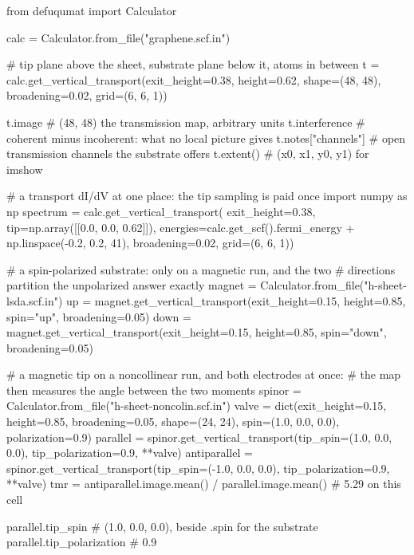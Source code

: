 \documentclass[11pt,a4paper]{article}
\begin{document}
\begin{pycode}
from defuqumat import Calculator

calc = Calculator.from_file("graphene.scf.in")

# tip plane above the sheet, substrate plane below it, atoms in between
t = calc.get_vertical_transport(exit_height=0.38, height=0.62,
                                shape=(48, 48), broadening=0.02,
                                grid=(6, 6, 1))

t.image            # (48, 48) the transmission map, arbitrary units
t.interference     # coherent minus incoherent: what no local picture gives
t.notes["channels"]  # open transmission channels the substrate offers
t.extent()         # (x0, x1, y0, y1) for imshow

# a transport dI/dV at one place: the tip sampling is paid once
import numpy as np
spectrum = calc.get_vertical_transport(
    exit_height=0.38, tip=np.array([[0.0, 0.0, 0.62]]),
    energies=calc.get_scf().fermi_energy + np.linspace(-0.2, 0.2, 41),
    broadening=0.02, grid=(6, 6, 1))

# a spin-polarized substrate: only on a magnetic run, and the two
# directions partition the unpolarized answer exactly
magnet = Calculator.from_file("h-sheet-lsda.scf.in")
up = magnet.get_vertical_transport(exit_height=0.15, height=0.85,
                                   spin="up", broadening=0.05)
down = magnet.get_vertical_transport(exit_height=0.15, height=0.85,
                                     spin="down", broadening=0.05)

# a magnetic tip on a noncollinear run, and both electrodes at once:
# the map then measures the angle between the two moments
spinor = Calculator.from_file("h-sheet-noncolin.scf.in")
valve = dict(exit_height=0.15, height=0.85, broadening=0.05,
             shape=(24, 24), spin=(1.0, 0.0, 0.0), polarization=0.9)
parallel = spinor.get_vertical_transport(tip_spin=(1.0, 0.0, 0.0),
                                         tip_polarization=0.9, **valve)
antiparallel = spinor.get_vertical_transport(tip_spin=(-1.0, 0.0, 0.0),
                                             tip_polarization=0.9, **valve)
tmr = antiparallel.image.mean() / parallel.image.mean()   # 5.29 on this cell

parallel.tip_spin           # (1.0, 0.0, 0.0), beside .spin for the substrate
parallel.tip_polarization   # 0.9
\end{pycode}
\end{document}
